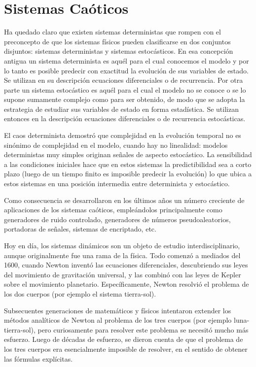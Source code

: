 \section{Sistemas Caóticos}

Ha quedado claro que existen sistemas deterministas que rompen con el preconcepto de que los sistemas físicos pueden clasificarse en dos conjuntos disjuntos: sistemas deterministas y sistemas estocásticos.
En esa concepción antigua un sistema determinista es aquél para el cual conocemos el modelo y por lo tanto es posible predecir con exactitud la evolución de sus variables de estado.
Se utilizan en su descripción ecuaciones diferenciales o de recurrencia.
Por otra parte un sistema estocástico es aquél para el cual el modelo no se conoce o se lo supone sumamente complejo como para ser obtenido, de modo que se adopta la estrategia de estudiar sus variables de estado en forma estadística.
Se utilizan entonces en la descripción ecuaciones diferenciales o de recurrencia estocásticas.

El caos determinista demostró que complejidad en la evolución temporal no es sinónimo de complejidad en el modelo, cuando hay no linealidad: modelos deterministas muy simples
originan señales de aspecto estocástico.
La sensibilidad a las condiciones iniciales hace que en estos sistemas la predictibilidad sea a corto plazo (luego de un tiempo finito es imposible predecir la evolución) lo que ubica a estos sistemas en una posición intermedia entre determinista y estocástico.

Como consecuencia se desarrollaron en los últimos años un número creciente de aplicaciones de los sistemas caóticos, empleándolos principalmente como generadores de
ruido controlado, generadores de números pseudoaleatorios, portadoras de señales, sistemas de encriptado, etc.

Hoy en día, los sistemas dinámicos son un objeto de estudio interdisciplinario, aunque originalmente fue una rama de la física.
Todo comenzó a mediados del 1600, cuando Newton inventó las ecuaciones diferenciales, descubriendo sus leyes del movimiento de gravitación universal, y las combinó con las leyes de Kepler sobre el movimiento planetario.
Específicamente, Newton resolvió el problema de los dos cuerpos (por ejemplo el sistema tierra-sol).

Subsecuentes generaciones de matemáticos y físicos intentaron extender los métodos analíticos de Newton al problema de los tres cuerpos (por ejemplo luna-tierra-sol), pero curiosamente para resolver este problema se necesitó mucho más esfuerzo.
Luego de décadas de esfuerzo, se dieron cuenta de que el problema de los tres cuerpos era esencialmente imposible de resolver, en el sentido de obtener las fórmulas explícitas.

